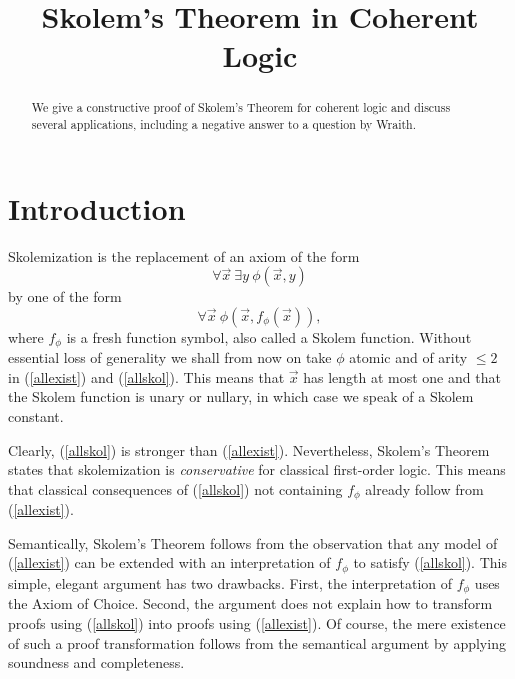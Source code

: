 \documentclass[10pt,a4paper]{article}
\begin{document}
\title{Skolem's Theorem in Coherent Logic}

\author{}
\date{}
\maketitle

\begin{abstract}
We give a constructive proof of Skolem's Theorem for coherent logic
and discuss several applications, including a negative answer to 
a question by Wraith.
\end{abstract}


\section*{Introduction}
Skolemization is the replacement of an axiom of the form
\begin{equation}\label{allexist}
\forall\vec{x}~\exists y~\phi(\vec{x},y)
\end{equation}
by one of the form
\begin{equation}\label{allskol}
\forall\vec{x}~\phi(\vec{x},f_\phi(\vec{x})),
\end{equation}
where $f_\phi$ is a fresh function symbol, also called a Skolem function.
Without essential loss of generality we shall from now on take $\phi$ atomic
and of arity $\leq 2$ in (\ref{allexist}) and (\ref{allskol}). This means
that $\vec{x}$ has length at most one and that the Skolem function is
unary or nullary, in which case we speak of a Skolem constant.

Clearly, (\ref{allskol}) is stronger than (\ref{allexist}).
Nevertheless, Skolem's Theorem states that skolemization is \emph{conservative}
for classical first-order logic. This means that classical consequences of
(\ref{allskol}) not containing $f_\phi$ already follow from (\ref{allexist}).

Semantically, Skolem's Theorem follows from the observation that
any model of (\ref{allexist}) can be extended with an interpretation
of $f_\phi$ to satisfy (\ref{allskol}). This simple, elegant argument has two
drawbacks. First, the interpretation of $f_\phi$ uses the Axiom of Choice.
Second, the argument does not explain how to transform proofs using
(\ref{allskol}) into proofs using (\ref{allexist}).
Of course, the mere existence of such a proof transformation
follows from the semantical argument by applying soundness and completeness.
\end{document}
